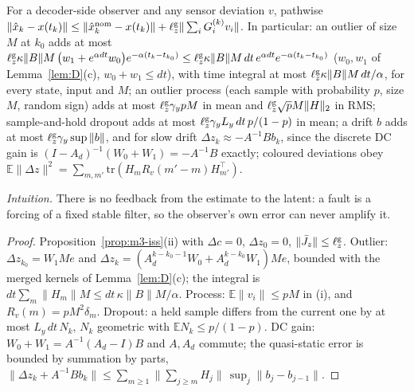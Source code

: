 \begin{corollary}\label{cor:m3-faults}
For a decoder-side observer and any sensor deviation $v$, pathwise
$\|\hat x_k-x(t_k)\|\le\|\hat x^{\rm nom}_k-x(t_k)\|+\ell^{\rm g}_z\|\sum_iG^{(k)}_iv_i\|$. In particular:
an outlier of size $M$ at $k_0$ adds at most
$\ell^{\rm g}_z\kappa\|B\|M\,\big(w_1+e^{\alpha dt}w_0\big)e^{-\alpha(t_k-t_{k_0})}\le\ell^{\rm g}_z\kappa\|B\|M\,dt\,e^{\alpha dt}e^{-\alpha(t_k-t_{k_0})}$
($w_0,w_1$ of Lemma~\ref{lem:D}(c), $w_0+w_1\le dt$), with time integral at most
$\ell^{\rm g}_z\kappa\|B\|M\,dt/\alpha$, for every state, input and $M$; an outlier process (each
sample with probability $p$, size $M$, random sign) adds at most $\ell^{\rm g}_z\gamma_ypM$ in mean and
$\ell^{\rm g}_z\sqrt pM\|H\|_2$ in RMS; sample-and-hold dropout adds at most
$\ell^{\rm g}_z\gamma_yL_y\,dt\,p/(1-p)$ in mean; a drift $b$ adds at most $\ell^{\rm g}_z\gamma_y\sup\|b\|$,
and for slow drift $\Delta z_k\approx-A^{-1}Bb_k$, since the discrete DC gain is
$(I-A_d)^{-1}(W_0+W_1)=-A^{-1}B$ exactly; coloured deviations obey
$\mathbb E\|\Delta z\|^2=\sum_{m,m'}\mathrm{tr}(H_mR_v(m'-m)H_{m'}^\top)$.
\end{corollary}

\emph{Intuition.} There is no feedback from the estimate to the latent: a fault is a forcing of a
fixed stable filter, so the observer's own error can never amplify it.

\begin{proof}
Proposition~\ref{prop:m3-iss}(ii) with $\Delta c=0$, $\Delta z_0=0$, $\|\bar J_z\|\le\ell^{\rm g}_z$. Outlier:
$\Delta z_{k_0}=W_1Me$ and $\Delta z_k=(A_d^{k-k_0-1}W_0+A_d^{k-k_0}W_1)Me$, bounded with the merged kernels of
Lemma~\ref{lem:D}(c); the integral is $dt\sum_m\|H_m\|M\le dt\,\kappa\|B\|M/\alpha$. Process:
$\mathbb E\|v_i\|\le pM$ in (i), and $R_v(m)=pM^2\delta_m$. Dropout: a held sample differs from the
current one by at most $L_y\,dt\,N_k$, $N_k$ geometric with $\mathbb EN_k\le p/(1-p)$. DC gain:
$W_0+W_1=A^{-1}(A_d-I)B$ and $A,A_d$ commute; the quasi-static error is bounded by summation by parts,
$\|\Delta z_k+A^{-1}Bb_k\|\le\sum_{m\ge1}\|\sum_{j\ge m}H_j\|\,\sup_j\|b_j-b_{j-1}\|$.
\end{proof}

